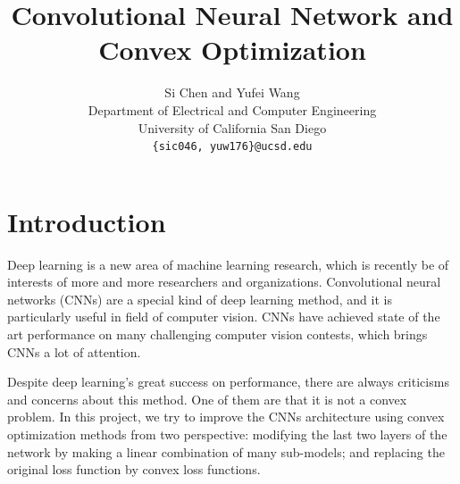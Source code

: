 \documentclass{article} %
\title{Convolutional Neural Network and Convex Optimization}
\author{
Si Chen  and   Yufei Wang\\
Department of Electrical and Computer Engineering\\
University of California San Diego\\
\texttt{\{sic046, yuw176\}@ucsd.edu}          \\
}
\begin{document}
\maketitle
\begin{abstract}

\end{abstract}
\section{Introduction}

Deep learning is a new area of machine learning research, which is recently be of interests of more and more researchers and organizations. Convolutional neural networks (CNNs) are a special kind of deep learning method, and it is particularly useful in field of computer vision. CNNs have achieved state of the art performance on many challenging computer vision contests, which brings CNNs a lot of attention.
\par
Despite deep learning's great success on performance, there are always criticisms and concerns about this method. One of them are that it is not a convex problem. In this project, we try to improve the CNNs architecture using convex optimization methods from two perspective: modifying the last two layers of the network by making a linear combination of many sub-models; and replacing the original loss function by convex loss functions.
\end{document}
